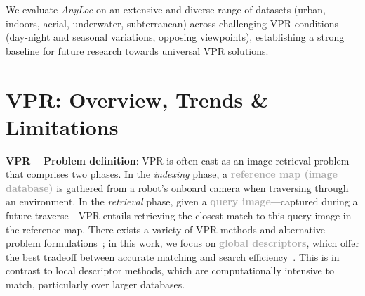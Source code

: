 \documentclass[letterpaper, 10 pt, conference]{ieeeconf}  \fi
\newcommand{\highlight}[1]{\textcolor{darkgray}{\textbf{#1}}}
\newcommand{\coolname}{\textit{AnyLoc}}
\begin{document}
We evaluate \coolname{} on an extensive and diverse range of datasets (urban, indoors, aerial, underwater, subterranean) across challenging VPR conditions (day-night and seasonal variations, opposing viewpoints), establishing a strong baseline for future research towards universal VPR solutions.











 
\section{VPR: Overview, Trends \& Limitations}
\label{sec:state_of_vpr}


\textbf{VPR -- Problem definition}: VPR is often cast as an image retrieval problem~\cite{garg2021your} that comprises two phases. In the \emph{indexing} phase, a \highlight{reference map (image database)} is gathered from a robot's onboard camera when traversing through an environment. In the \emph{retrieval} phase, given a \highlight{query image}---captured during a future traverse---VPR entails retrieving the closest match to this query image in the reference map. There exists a variety of VPR methods and alternative problem formulations~\cite{lowry2015visual,berton2022deep,pion2020benchmarking,zaffar2021vpr,schubert2023visual}; in this work,
we focus on \highlight{global descriptors}, which offer the best tradeoff between accurate matching and search efficiency~\cite{jegou2010aggregating,sattler2018benchmarking,garg2021your}. This is in contrast to local descriptor methods, which are computationally intensive to match, particularly over larger databases.
\end{document}
